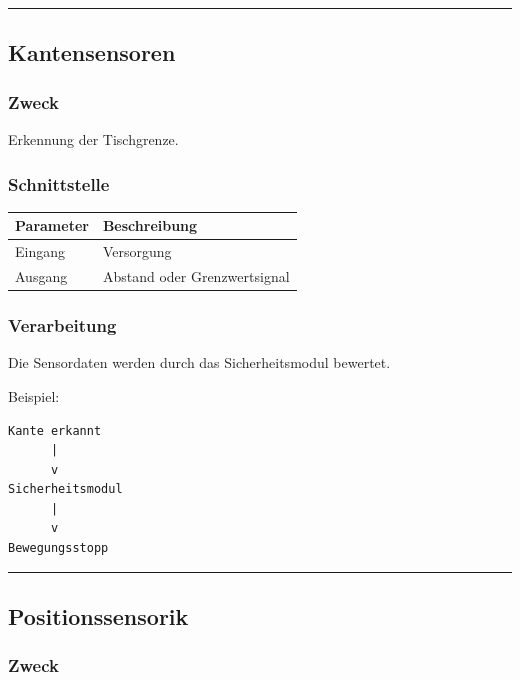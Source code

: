 \documentclass[
]{article}
\begin{document}
\begin{center}\rule{0.5\linewidth}{0.5pt}\end{center}

\subsection{Kantensensoren}\label{kantensensoren}

\subsubsection{Zweck}\label{zweck-1}

Erkennung der Tischgrenze.

\subsubsection{Schnittstelle}\label{schnittstelle-1}

\begin{longtable}[]{@{}ll@{}}
\toprule\noalign{}
Parameter & Beschreibung \\
\midrule\noalign{}
\endhead
\bottomrule\noalign{}
\endlastfoot
Eingang & Versorgung \\
Ausgang & Abstand oder Grenzwertsignal \\
\end{longtable}

\subsubsection{Verarbeitung}\label{verarbeitung}

Die Sensordaten werden durch das Sicherheitsmodul bewertet.

Beispiel:

\begin{verbatim}
Kante erkannt
      |
      v
Sicherheitsmodul
      |
      v
Bewegungsstopp
\end{verbatim}

\begin{center}\rule{0.5\linewidth}{0.5pt}\end{center}

\subsection{Positionssensorik}\label{positionssensorik-2}

\subsubsection{Zweck}\label{zweck-2}
\end{document}

